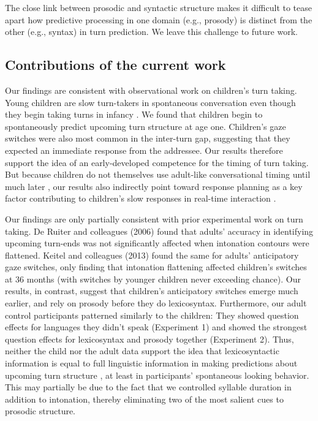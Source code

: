 \documentclass[authoryear, 12pt]{elsarticle}
\begin{document}
The close link between prosodic and syntactic structure makes it difficult to tease apart how predictive processing in one domain (e.g., prosody) is distinct from the other (e.g., syntax) in turn prediction. We leave this challenge to future work.

\subsection{Contributions of the current work}

Our findings are consistent with observational work on children's turn taking. Young children are slow turn-takers in spontaneous conversation \citep{casillasUndRev} even though they begin taking turns in infancy \citep{hilbrinkInPrep, jaffe2001}. We found that children begin to spontaneously predict upcoming turn structure at age one. Children's gaze switches were also most common in the inter-turn gap, suggesting that they expected an immediate response from the addressee. Our results therefore support the idea of an early-developed competence for the timing of turn taking. But because children do not themselves use adult-like conversational timing until much later \citep[age six; ][]{ervin-tripp1979}, our results also indirectly point toward response planning as a key factor contributing to children's slow responses in real-time interaction \citep{casillasUndRev}.

Our findings are only partially consistent with prior experimental work on turn taking. De Ruiter and colleagues (2006) found that adults' accuracy in identifying upcoming turn-ends was not significantly affected when intonation contours were flattened. Keitel and colleagues (2013) found the same for adults' anticipatory gaze switches, only finding that intonation flattening affected children's switches at 36 months (with switches by younger children never exceeding chance). Our results, in contrast, suggest that children's anticipatory switches emerge much earlier, and rely on prosody before they do lexicosyntax. Furthermore, our adult control participants patterned similarly to the children: They showed question effects for languages they didn't speak (Experiment 1) and showed the strongest question effects for lexicosyntax and prosody together (Experiment 2). Thus, neither the child nor the adult data support the idea that lexicosyntactic information is equal to full linguistic information in making predictions about upcoming turn structure \citep{de-ruiter2006}, at least in participants' spontaneous looking behavior. This may partially be due to the fact that we controlled syllable duration in addition to intonation, thereby eliminating two of the most salient cues to prosodic structure. 
\end{document}
